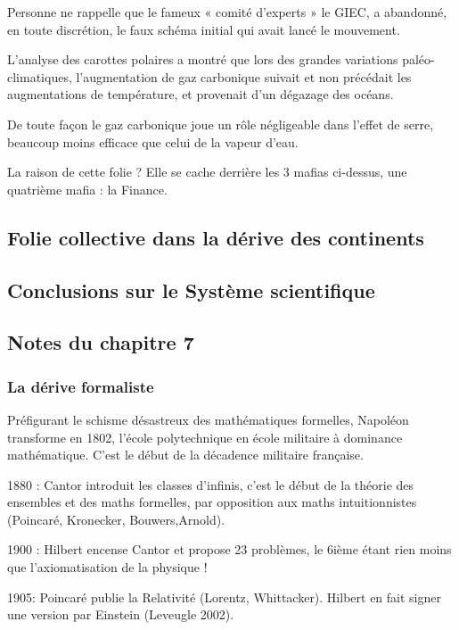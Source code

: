 \documentclass[a4paper,12pt]{article}
\begin{document}
Personne ne rappelle que le fameux « comité d’experts » le GIEC, a abandonné, en toute discrétion, le faux schéma initial qui avait lancé le mouvement.

L’analyse des carottes polaires a montré que lors des grandes variations paléo-climatiques, l’augmentation de gaz carbonique suivait et non précédait les augmentations de température, et provenait d’un dégazage des océans.

De toute façon le gaz carbonique joue un rôle négligeable dans l’effet de serre, beaucoup moins efficace que celui de la vapeur d’eau.

La raison de cette folie ? Elle se cache derrière les 3 mafias ci-dessus, une quatrième mafia : la Finance.




\subsection {Folie collective dans la dérive des continents}

\subsection {Conclusions sur le Système scientifique}

\subsection {Notes du chapitre 7}

\subsubsection{La dérive formaliste}

Préfigurant le schisme désastreux des mathématiques formelles, Napoléon transforme en 1802,  l'école 
polytechnique en école militaire à dominance mathématique. C'est le début de la décadence militaire française.

1880 : Cantor introduit les classes d'infinis, c'est le début de la théorie des ensembles et des maths formelles, par opposition aux maths intuitionnistes (Poincaré, Kronecker, Bouwers,Arnold).

1900 : Hilbert encense Cantor et propose 23 problèmes, le 6ième étant rien moins que l'axiomatisation de la physique !

1905: Poincaré publie la Relativité (Lorentz, Whittacker). Hilbert en fait signer une version par Einstein (Leveugle 2002).  
\end{document}
